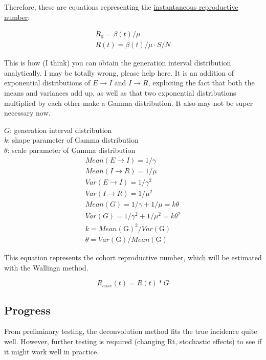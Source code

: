 \documentclass{article}
\begin{document}
Therefore, these are equations representing the \href{https://www.ncbi.nlm.nih.gov/pmc/articles/PMC3935673/}{instantaneous reproductive number}:

\begin{align}
    R_0 = \beta(t)/\mu \\
    R(t) = \beta(t)/\mu \cdot S/N
\end{align}

This is how (I think) you can obtain the generation interval distribution analytically. I may be totally wrong, please help here. It is an addition of exponential distributions of $E \xrightarrow{}I$ and $I \xrightarrow{} R$, exploiting the fact that both the means and variances add up, as well as that two exponential distributions multiplied by each other make a Gamma distribution. It also may not be super necessary now.


$G$: generation interval distribution \\ 
$k$: shape parameter of Gamma distribution\\
$\theta$: scale parameter of Gamma distribution\\

\begin{align}
    Mean(E \xrightarrow{}I) = 1/\gamma \\ 
    Mean(I \xrightarrow{}R) = 1/\mu \\ 
    Var(E \xrightarrow{}I) = 1/\gamma^2 \\ 
    Var(I \xrightarrow{}R) = 1/\mu^2 \\
    Mean(G) = 1/\gamma + 1/\mu = k\theta\\ 
    Var(G) = 1/\gamma^2 + 1/\mu^2 = k\theta^2 \\ 
    k =  Mean(\text{G})^2/Var(\text{G}) \\
    \theta = Var(\text{G})/Mean(\text{G})
\end{align}

This equation represents the cohort reproductive number, which will be estimated with the Wallinga method.

\begin{equation}
    R_{case}(t) = R(t) * G
\end{equation}

\subsection{Progress}
From preliminary testing, the deconvolution method fits the true incidence quite well. However, further testing is required (changing Rt, stochastic effects) to see if it might work well in practice.
\end{document}
